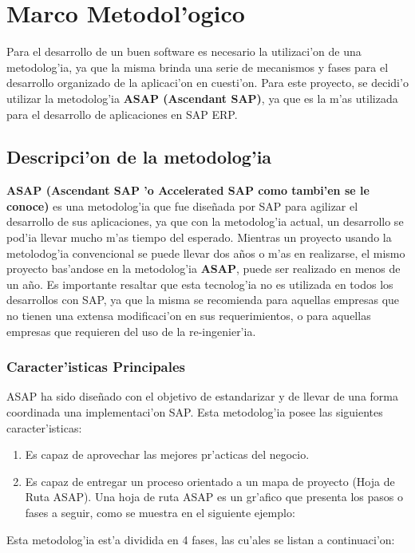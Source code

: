 \chapter{Marco Metodol'ogico} \label{chap:metodologia}
Para el desarrollo de un buen software es necesario la utilizaci'on de una metodolog'ia, ya que la misma brinda una serie de mecanismos y fases para el desarrollo organizado de la aplicaci'on en cuesti'on.
Para este proyecto, se decidi'o utilizar la metodolog'ia \textbf{ASAP (Ascendant SAP)}, ya que es la m'as utilizada para el desarrollo de aplicaciones en SAP ERP.
\section{Descripci'on de la metodolog'ia}
\textbf{ASAP (Ascendant SAP 'o Accelerated SAP como tambi'en se le conoce)} es una metodolog'ia que fue dise\~nada por SAP para agilizar el desarrollo de sus aplicaciones, ya que con la metodolog'ia actual, un desarrollo se pod'ia llevar mucho m'as tiempo del esperado. Mientras un proyecto usando la metolodog'ia convencional se puede llevar dos a\~nos o m'as en realizarse, el mismo proyecto bas'andose en la metodolog'ia \textbf{ASAP}, puede ser realizado en menos de un a\~no. 
Es importante resaltar que esta tecnolog'ia no es utilizada en todos los desarrollos con SAP, ya que la misma se recomienda para aquellas empresas que no tienen una extensa modificaci'on en sus requerimientos, o para aquellas empresas que requieren del uso de la re-ingenier'ia.
\subsection{Caracter'isticas Principales}
ASAP ha sido dise\~nado con el objetivo de estandarizar y de llevar de una forma coordinada una implementaci'on SAP.  Esta metodolog'ia posee las siguientes caracter'isticas:
\begin{enumerate}
item Es capaz de optimizar tiempo, calidad y recursos.
\item Es capaz de aprovechar las mejores pr'acticas del negocio.
\item Es capaz de entregar un proceso orientado a un mapa de proyecto (Hoja de Ruta ASAP). Una hoja de ruta ASAP es un gr'afico que presenta los pasos o fases a seguir, como se muestra en el siguiente ejemplo: 

\end{enumerate}
Esta metodolog'ia est'a dividida en 4 fases, las cu'ales se listan a continuaci'on:
